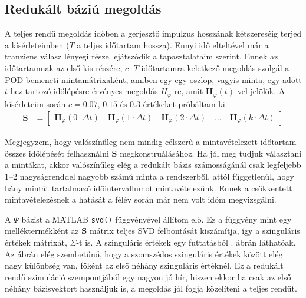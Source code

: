         \subsection{Redukált báziú megoldás}
            A teljes rendű megoldás időben a gerjesztő impulzus hosszának kétszereséig terjed a kísérleteimben ($T$ a teljes időtartam hossza). Ennyi idő elteltével már a tranziens válasz lényegi része lejátszódik a tapasztalataim szerint. Ennek az időtartamnak az első kis részére, $c\cdot T$ időtartamra keletkező megoldás szolgál a POD bemeneti mintamátrixaként, amiben egy-egy oszlop, vagyis minta, egy adott $t$-hez tartozó időlépésre érvényes megoldás $H_{\varphi}$-re, amit $\textbf{H}_{\varphi}(t)$-vel jelölök. A kísérleteim során $c=0.07$, $0.15$ és $0.3$ értékeket próbáltam ki.
            \begin{equation}\label{equ:minta}
                \begin{aligned}
                    \textbf{S} &= \begin{bmatrix}
                        \textbf{H}_{\varphi}(0\cdot\Delta t)\quad
                        \textbf{H}_{\varphi}(1\cdot\Delta t)\quad
                        \textbf{H}_{\varphi}(2\cdot\Delta t)\quad
                        \hdots\quad
                        \textbf{H}_{\varphi}(k\cdot\Delta t) \end{bmatrix}
                \end{aligned}
            \end{equation}
            \par
            Megjegyzem, hogy valószínűleg nem mindig célszerű a mintavételezett időtartam összes időlépését felhasználni $\textbf{S}$ megkonstruálásához. Ha jól meg tudjuk választani a mintákat, akkor valószínűleg elég a redukált bázis számosságánál csak legfeljebb \qtyrange{1}{2}{} nagyságrenddel nagyobb számú minta a rendszerből, attól függetlenül, hogy hány mintát tartalmazó időintervallumot mintavételezünk. Ennek a csökkentett mintavételezésnek a hatását a félév során már nem volt időm megvizsgálni.
            \par
            A $\Psi$ bázist a MATLAB \verb|svd()| függvényével állítom elő. Ez a függvény mint egy melléktermékként az $\textbf{S}$ mátrix teljes SVD felbontását kiszámítja, így a szinguláris értékek mátrixát, $\Sigma$-t is. A szinguláris értékek egy futtatásból . ábrán láthatóak. Az ábrán elég szembetűnő, hogy a szomszédos szinguláris értékek között elég nagy különbség van, főként az első néhány szinguláris értéknél. Ez a redukált rendű szimuláció szempontjából egy nagyon jó hír, hiszen ekkor ha csak az első néhány bázisvektort használjuk is, a megoldás jól fogja közelíteni a teljes rendűt.

